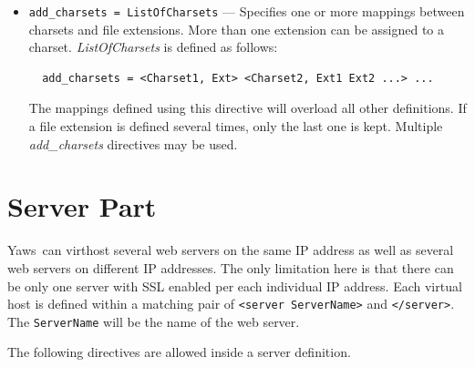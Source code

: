 \documentclass[11pt,oneside,english]{book}
\newcommand{\Yaws}            %
        {{\sc Yaws}}
\begin{document}
\begin{itemize}
\item        \verb+add_charsets = ListOfCharsets+ ---
              Specifies one or more mappings between charsets and file
              extensions. More than one extension can be assigned to a
              charset. \textit{ListOfCharsets} is defined as follows:
\begin{verbatim}
  add_charsets = <Charset1, Ext> <Charset2, Ext1 Ext2 ...> ...
\end{verbatim}
              The mappings defined using this directive will overload all other
              definitions. If a file extension is defined several times, only
              the last one is kept. Multiple \textit{add\_charsets} directives
              may be used.
\end{itemize}



\section{Server Part}

\Yaws\ can virthost several web servers on the same IP address as well
as several web servers on different IP addresses.  The only limitation
here is that there can be only one server with SSL enabled per each
individual IP address.  Each virtual host is defined within a matching
pair of \verb+<server ServerName>+ and \verb+</server>+.  The
\verb+ServerName+ will be the name of the web server.

The following directives are allowed inside a server definition.
\end{document}
